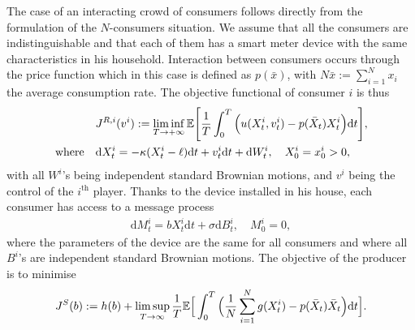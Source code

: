 \documentclass[a4paper,10pt]{article}
\newcommand{\EE}{\mathbb{E}}
\newcommand{\D}{\mathrm{d}}
\theoremstyle{definition}
\theoremstyle{plain}
\numberwithin{equation}{section}
\begin{document}
The case of an interacting crowd of consumers follows directly from the formulation of the $N$-consumers situation. 
We assume that all the consumers are indistinguishable and that each of them has a smart meter device with the same characteristics in his household. 
Interaction between consumers occurs through the price function which in this case is defined as $p(\bar x)$, with $N \bar x := \sum_{i=1}^N x_i$ the average consumption rate. 
The objective functional of consumer $i$ is thus
\begin{align}
&	J^{\rm {R},i}(v^i)  := \liminf_{T\to +\infty} \EE\Bigg[ \frac1T \int_0^T \Big( u(X^i_t,v^i _t) - p(\bar X_t) X^i_t \Big) \D t \Bigg], \\
 \text{where} \quad	
 & \D X^i_t = -\kappa (X^i_t - \ell) \D t + v^i_t \D t + \D W^i_t, \quad X_0^i =x_0^i>0,
\end{align}
with all $W^i$'s being independent standard Brownian motions, and $v^i$ being the control of the $i^{\text{th}}$ player. 
Thanks to the device installed in his house, each consumer has access to a message process
\begin{align}
	\D M^i_t = bX^i_t \D t  + \sigma \D B^i_t, \quad M_0^i =0,
\end{align}
where the parameters of the device are the same for all consumers and where all $B^i$'s are independent standard Brownian motions. The objective of the producer is to minimise
\begin{align}
	J^{\rm{S}}(b) :=  h(b) + \limsup_{T \to \infty} \frac{1}{T} \EE\Big[ \int_0^T \Big( \frac1N \sum_{i=1}^N g(X^i_t) - p(\bar X_t) \bar X_t \Big) \D t\Big].
\end{align}
\end{document}
